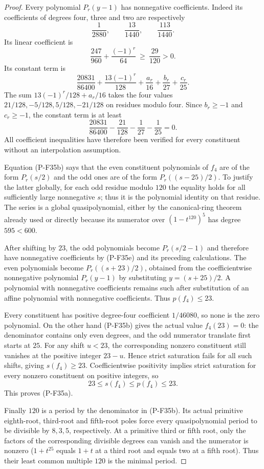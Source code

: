 \begin{proof}
Every polynomial $P_r(y-1)$ has nonnegative coefficients.
Indeed its coefficients of degrees four, three and two are
respectively
\[
              \frac1{2880},\qquad\frac{13}{1440},
                       \qquad\frac{113}{1440}.
\]
Its linear coefficient is
\[
             \frac{247}{960}+\frac{(-1)^r}{64}
                     \ \ge\ \frac{29}{120}>0.
\]
Its constant term is
\[
 \frac{20831}{86400}+\frac{13(-1)^r}{128}
                        +\frac{a_r}{16}+\frac{b_r}{27}
                        +\frac{c_r}{25}.
\]
The sum $13(-1)^r/128+a_r/16$ takes the four values
$21/128,-5/128,5/128,-21/128$ on residues modulo four.
Since $b_r\ge-1$ and $c_r\ge-1$, the constant term is at least
\[
 \frac{20831}{86400}-\frac{21}{128}-\frac1{27}-\frac1{25}=0.
 \tag{P-F35e}
\]
All coefficient inequalities have therefore been verified
for every constituent without an interpolation assumption.

Equation (P-F35b) says that the even constituent polynomials
of $f_4$ are of the form $P_r(s/2)$ and the odd ones are
of the form $P_r((s-25)/2)$. To justify the latter globally,
for each odd residue modulo $120$ the equality holds for
all sufficiently large nonnegative $s$; thus it is the
polynomial identity on that residue. The series is a global
quasipolynomial, either by the canonical-ring theorem already
used or directly because its numerator over $(1-t^{120})^5$
has degree $595<600$.

After shifting by $23$, the odd polynomials become
$P_r(s/2-1)$ and therefore have nonnegative coefficients
by (P-F35e) and its preceding calculations. The even
polynomials become $P_r((s+23)/2)$, obtained from the
coefficientwise nonnegative polynomial $P_r(y-1)$ by
substituting $y=(s+25)/2$. A polynomial with nonnegative
coefficients remains such after substitution of an affine
polynomial with nonnegative coefficients. Thus $p(f_4)\le23$.

Every constituent has positive degree-four coefficient
$1/46080$, so none is the zero polynomial. On the other
hand (P-F35b) gives the actual value $f_4(23)=0$:
the denominator contains only even degrees, and the odd
numerator translate first starts at $25$. For any shift
$u<23$, the corresponding nonzero constituent still
vanishes at the positive integer $23-u$. Hence strict
saturation fails for all such shifts, giving
$s(f_4)\ge23$. Coefficientwise positivity implies strict
saturation for every nonzero constituent on positive
integers, so
\[
                   23\le s(f_4)\le p(f_4)\le23.
\]
This proves (P-F35a).

Finally $120$ is a period by the denominator in (P-F35b).
Its actual primitive eighth-root, third-root and fifth-root
poles force every quasipolynomial period to be divisible
by $8,3,5$, respectively. At a primitive third or fifth root,
only the factors of the corresponding divisible degrees
can vanish and the numerator is nonzero ($1+t^{25}$ equals
$1+t$ at a third root and equals two at a fifth root).
Thus their least common multiple $120$ is the minimal period.
\end{proof}

